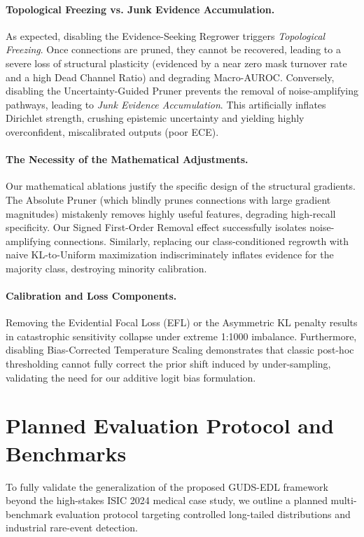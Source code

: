 \documentclass[letterpaper]{article} %
\begin{document}
\paragraph{Topological Freezing vs. Junk Evidence Accumulation.}
As expected, disabling the Evidence-Seeking Regrower triggers \emph{Topological Freezing}. Once connections are pruned, they cannot be recovered, leading to a severe loss of structural plasticity (evidenced by a near zero mask turnover rate and a high Dead Channel Ratio) and degrading Macro-AUROC. Conversely, disabling the Uncertainty-Guided Pruner prevents the removal of noise-amplifying pathways, leading to \emph{Junk Evidence Accumulation}. This artificially inflates Dirichlet strength, crushing epistemic uncertainty and yielding highly overconfident, miscalibrated outputs (poor ECE).

\paragraph{The Necessity of the Mathematical Adjustments.}
Our mathematical ablations justify the specific design of the structural gradients. The Absolute Pruner (which blindly prunes connections with large gradient magnitudes) mistakenly removes highly useful features, degrading high-recall specificity. Our Signed First-Order Removal effect successfully isolates noise-amplifying connections. Similarly, replacing our class-conditioned regrowth with naive KL-to-Uniform maximization indiscriminately inflates evidence for the majority class, destroying minority calibration.

\paragraph{Calibration and Loss Components.}
Removing the Evidential Focal Loss (EFL) or the Asymmetric KL penalty results in catastrophic sensitivity collapse under extreme 1:1000 imbalance. Furthermore, disabling Bias-Corrected Temperature Scaling demonstrates that classic post-hoc thresholding cannot fully correct the prior shift induced by under-sampling, validating the need for our additive logit bias formulation.



\section{Planned Evaluation Protocol and Benchmarks}\label{sec:planned_protocol}
To fully validate the generalization of the proposed GUDS-EDL framework beyond the high-stakes ISIC 2024 medical case study, we outline a planned multi-benchmark evaluation protocol targeting controlled long-tailed distributions and industrial rare-event detection.
\end{document}
